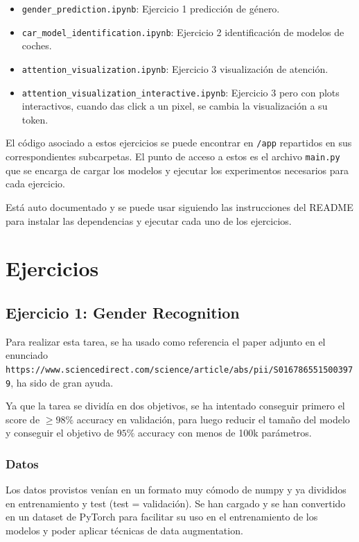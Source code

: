 \documentclass[11pt,spanish,listoffigures,listoftables]{tfgetsinf}
\begin{document}
\begin{itemize}
  \item \texttt{gender\_prediction.ipynb}: Ejercicio 1 predicción de género.
  \item \texttt{car\_model\_identification.ipynb}: Ejercicio 2 identificación de modelos de coches.
  \item \texttt{attention\_visualization.ipynb}: Ejercicio 3 visualización de atención.
  \item \texttt{attention\_visualization\_interactive.ipynb}: Ejercicio 3 pero con plots interactivos, cuando das click a un pixel, se cambia la visualización a su token.
\end{itemize}

 El código asociado a estos ejercicios se puede encontrar en \texttt{/app} repartidos en sus correspondientes subcarpetas. El punto de acceso a estos es el archivo \texttt{main.py} que se encarga de cargar los modelos y ejecutar los experimentos necesarios para cada ejercicio.

 Está auto documentado y se puede usar siguiendo las instrucciones del README para instalar las dependencias y ejecutar cada uno de los ejercicios.

\chapter{Ejercicios}
\section{Ejercicio 1: Gender Recognition}

Para realizar esta tarea, se ha usado como referencia el paper adjunto en el enunciado \\\texttt{https://www.sciencedirect.com/science/article/abs/pii/S0167865515003979}, ha sido de gran ayuda.

Ya que la tarea se dividía en dos objetivos, se ha intentado conseguir primero el score de $\geq 98\%$ accuracy en validación, para luego reducir el tamaño del modelo y conseguir el objetivo de $95\%$ accuracy con menos de 100k parámetros.

\subsection{Datos}
Los datos provistos venían en un formato muy cómodo de numpy y ya divididos en entrenamiento y test (test = validación). Se han cargado y se han convertido en un dataset de PyTorch para facilitar su uso en el entrenamiento de los modelos y poder aplicar técnicas de data augmentation.
\end{document}
